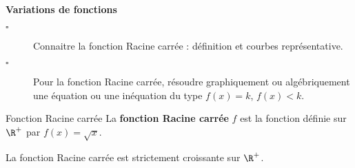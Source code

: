 \begin{titre}

\end{titre}


 
\begin{CpsCol}
\textbf{Variations de fonctions}
\begin{description}
\item[$\square$] Connaitre la fonction Racine carrée : définition et courbes représentative.
\item[$\square$] Pour la fonction Racine carrée, résoudre graphiquement ou algébriquement une équation ou une inéquation du type $f(x) = k$, $f(x) < k$.
\end{description}
\end{CpsCol}




\begin{DefT}{Fonction Racine carrée}
La \textbf{fonction Racine carrée} $f$ est la fonction définie sur $\R^+$ par $f(x)=\sqrt x$.
\end{DefT}

 



\begin{Pp}[Variations]
\begin{minipage}{0.48\linewidth}
La fonction Racine carrée est strictement  croissante sur $\R^+$.  
\end{minipage}
\hfill
\begin{minipage}{0.48\linewidth}
\end{minipage}
\end{Pp}

\ROC

